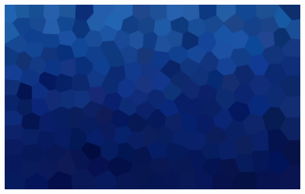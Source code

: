\documentclass[aspectratio=169,xcolor=dvipsnames, t]{beamer}
\begin{document}
{
{
    \includegraphics[width=\paperwidth,height=\paperheight]{AICStyleData/logos/mene_polygonu_bg.png}
}
}
\end{document}
